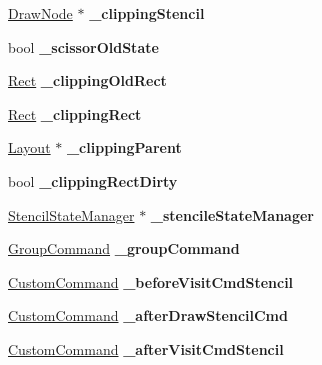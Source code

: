 \begin{DoxyCompactItemize}
\hyperlink{classDrawNode}{Draw\+Node} $\ast$ {\bfseries \+\_\+clipping\+Stencil}
\item 
\mbox{\label{classui_1_1Layout_aadabf91c87c99b50d890832a8e853d3e}} 
bool {\bfseries \+\_\+scissor\+Old\+State}
\item 
\mbox{\label{classui_1_1Layout_a63134b34bf13942d4f896f1f2eb76b4d}} 
\hyperlink{classRect}{Rect} {\bfseries \+\_\+clipping\+Old\+Rect}
\item 
\mbox{\label{classui_1_1Layout_a8c703201a703e1d8d9797636e5ae1f80}} 
\hyperlink{classRect}{Rect} {\bfseries \+\_\+clipping\+Rect}
\item 
\mbox{\label{classui_1_1Layout_a3e60aa56107ccb801560ee831816be5b}} 
\hyperlink{classui_1_1Layout}{Layout} $\ast$ {\bfseries \+\_\+clipping\+Parent}
\item 
\mbox{\label{classui_1_1Layout_ab4622d1c40dd32e8cb02aa478687e93c}} 
bool {\bfseries \+\_\+clipping\+Rect\+Dirty}
\item 
\mbox{\label{classui_1_1Layout_ada980759533cc176ff62532c83da45a8}} 
\hyperlink{classStencilStateManager}{Stencil\+State\+Manager} $\ast$ {\bfseries \+\_\+stencile\+State\+Manager}
\item 
\mbox{\label{classui_1_1Layout_a4f72e51f0858b73d7f0a05a8ab91fcc8}} 
\hyperlink{classGroupCommand}{Group\+Command} {\bfseries \+\_\+group\+Command}
\item 
\mbox{\label{classui_1_1Layout_abfd34df264b0c179d30fd5059770745e}} 
\hyperlink{classCustomCommand}{Custom\+Command} {\bfseries \+\_\+before\+Visit\+Cmd\+Stencil}
\item 
\mbox{\label{classui_1_1Layout_a76a1d596801f9515d59f86d07ad239f9}} 
\hyperlink{classCustomCommand}{Custom\+Command} {\bfseries \+\_\+after\+Draw\+Stencil\+Cmd}
\item 
\mbox{\label{classui_1_1Layout_a03d0c097286db630cad3028dabfea9c9}} 
\hyperlink{classCustomCommand}{Custom\+Command} {\bfseries \+\_\+after\+Visit\+Cmd\+Stencil}

\end{DoxyCompactItemize}
